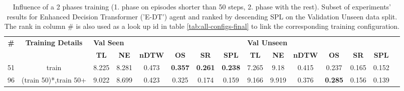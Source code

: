 \begin{table}
\centering
\caption{\label{tab:e_dt_split_training_50}Influence of a 2 phases training (1. phase on episodes shorter than 50 steps, 2. phase with the rest). Subset of experiments' results for Enhanced Decision Transformer ('E-DT') agent and ranked by descending SPL on the Validation Unseen data split. The rank in column \# is also used as a look up id in table \ref{tab:all-configs-final} to link the corresponding training configuration.}
\begin{tabular}{@{\hskip3pt}c@{\hskip3pt}c@{\hskip3pt}c@{\hskip3pt}c@{\hskip3pt}c@{\hskip3pt}c@{\hskip3pt}c@{\hskip3pt}c@{\hskip3pt}c@{\hskip3pt}c@{\hskip3pt}c@{\hskip3pt}c@{\hskip3pt}c@{\hskip3pt}c@{\hskip3pt}c}
\toprule
\textbf{\#} & \textbf{Training Details} & \multicolumn{6}{l}{\textbf{Val Seen}} & \multicolumn{6}{l}{\textbf{Val Unseen}} \\
 \textbf{~} &                \textbf{~} &       \textbf{TL} & \textbf{NE} & \textbf{nDTW} &     \textbf{OS} &     \textbf{SR} &    \textbf{SPL} &         \textbf{TL} & \textbf{NE} & \textbf{nDTW} &     \textbf{OS} & \textbf{SR} & \textbf{SPL} \\
\midrule
         51 &                     train &             8.225 &       8.281 &         0.473 &  \textbf{0.357} &  \textbf{0.261} &  \textbf{0.238} &               7.265 &        9.18 &         0.415 &           0.237 &       0.165 &        0.152 \\
         96 &     (train 50)*,train 50+ &             9.022 &       8.699 &         0.423 &           0.325 &           0.174 &           0.159 &               9.166 &       9.919 &         0.376 &  \textbf{0.285} &       0.156 &        0.139 \\
\bottomrule
\end{tabular}
\end{table}
